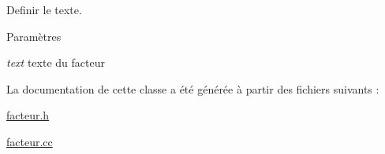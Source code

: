 Definir le texte. 


\begin{DoxyParams}{Paramètres}
\item[{\em text}]texte du facteur \end{DoxyParams}


La documentation de cette classe a été générée à partir des fichiers suivants :\begin{DoxyCompactItemize}
\item 
\hyperlink{facteur_8h}{facteur.h}\item 
\hyperlink{facteur_8cc}{facteur.cc}\end{DoxyCompactItemize}
